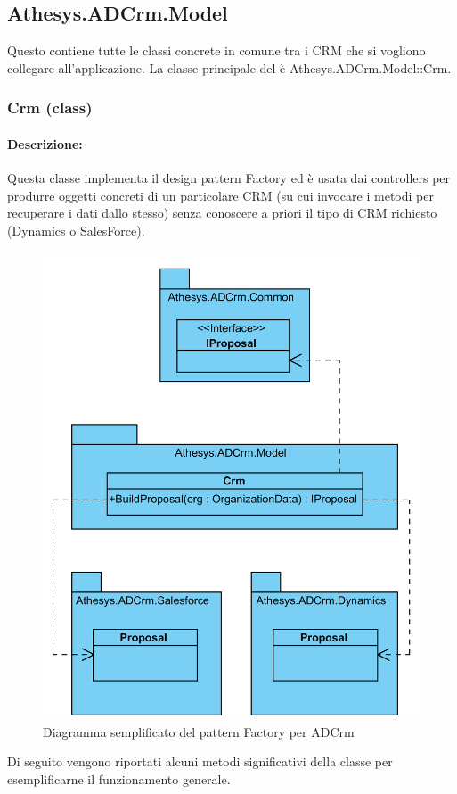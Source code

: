 \subsection{Athesys.ADCrm.Model}
Questo  contiene tutte le classi concrete in comune tra i CRM che si vogliono collegare all'applicazione.
La classe principale del  è Athesys.ADCrm.Model::Crm.
\subsubsection{Crm (class)}
\paragraph{Descrizione:}
Questa classe implementa il design pattern Factory ed è usata dai controllers per produrre oggetti concreti di un particolare CRM (su cui invocare i metodi per recuperare i dati dallo stesso) senza conoscere a priori il tipo di CRM richiesto (Dynamics o SalesForce).

\begin{figure}[H]
	\centering
	\includegraphics[width=\linewidth]{images/factoryInADCrm}
	\caption{Diagramma semplificato del pattern Factory per ADCrm}
	\label{fig:factoryInADCrm}
\end{figure}
Di seguito vengono riportati alcuni metodi significativi della classe per esemplificarne il funzionamento generale.



